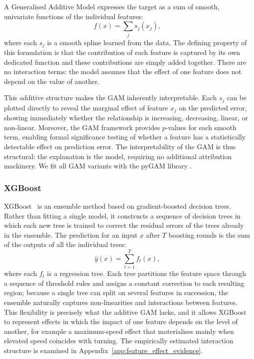 \documentclass[12pt]{article}
\begin{document}
A Generalised Additive Model expresses the target as a sum of smooth, univariate functions of the individual features:
\begin{equation}
  f(x) = \sum_{j} s_j(x_j),
  \label{eq:gam}
\end{equation}
where each $s_j$ is a smooth spline learned from the data. The defining property of this formulation is that the contribution of each feature is captured by its own dedicated function and these contributions are simply added together. There are no interaction terms: the model assumes that the effect of one feature does not depend on the value of another.

This additive structure makes the GAM inherently interpretable. Each $s_j$ can be plotted directly to reveal the marginal effect of feature $x_j$ on the predicted error, showing immediately whether the relationship is increasing, decreasing, linear, or non-linear. Moreover, the GAM framework provides $p$-values for each smooth term, enabling formal significance testing of whether a feature has a statistically detectable effect on prediction error. The interpretability of the GAM is thus structural: the explanation is the model, requiring no additional attribution machinery. We fit all GAM variants with the pyGAM library \citep{serven2025pygam}.

\subsubsection{XGBoost}

XGBoost~\citep{chen2016xgboost} is an ensemble method based on gradient-boosted decision trees. Rather than fitting a single model, it constructs a sequence of decision trees in which each new tree is trained to correct the residual errors of the trees already in the ensemble. The prediction for an input $x$ after $T$ boosting rounds is the sum of the outputs of all the individual trees:
\begin{equation}
  \hat{y}(x) = \sum_{t=1}^{T} f_t(x),
  \label{eq:xgboost}
\end{equation}
where each $f_t$ is a regression tree. Each tree partitions the feature space through a sequence of threshold rules and assigns a constant correction to each resulting region; because a single tree can split on several features in succession, the ensemble naturally captures non-linearities and interactions between features. This flexibility is precisely what the additive GAM lacks, and it allows XGBoost to represent effects in which the impact of one feature depends on the level of another, for example a maximum-speed effect that materialises mainly when elevated speed coincides with turning. The empirically estimated interaction structure is examined in Appendix~\ref{app:feature_effect_evidence}.
\end{document}

